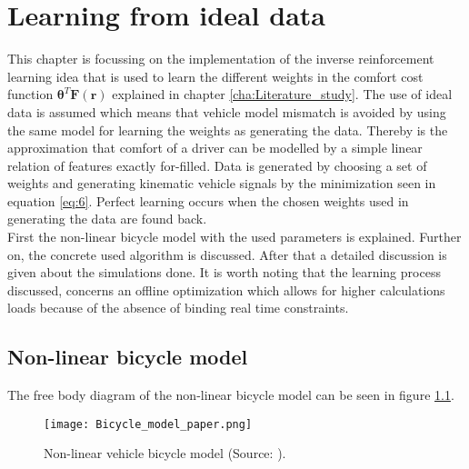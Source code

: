 \chapter{Learning from ideal data\\}
\label{cha:Learning_algorithm}

This chapter is focussing on the implementation of the inverse reinforcement learning idea that is used to learn the different weights in the comfort cost function $\bm{\theta}^T\bm{F}(\bm{r})$
explained in chapter \ref{cha:Literature_study}. The use of ideal data is assumed which means that vehicle model mismatch is avoided by using the same model for learning the weights as generating the data. Thereby is the approximation that comfort of a driver can be modelled by a simple linear relation of features exactly for-filled. Data is generated by choosing a set of weights and generating kinematic vehicle signals by the minimization seen in equation \ref{eq:6}. Perfect learning occurs when the chosen weights used in generating the data are found back.\\

First the non-linear bicycle model with the used parameters is explained. Further on, the concrete used algorithm is discussed. After that a detailed discussion is given about the simulations done. It is worth noting that the learning process discussed, concerns an offline optimization which allows for higher calculations loads because of the absence of binding real time constraints.


\section{Non-linear bicycle model}\label{sec:Vehicle_models}
The free body diagram of the non-linear bicycle model can be seen in figure \ref{fig:bicycle_model}.\\

\begin{figure}[h!]
	\centering
	\texttt{[image: Bicycle\_model\_paper.png]}
	\caption{Non-linear vehicle bicycle model (Source: \cite{TongDuySon2019}).}
	\label{fig:bicycle_model}
\end{figure}

